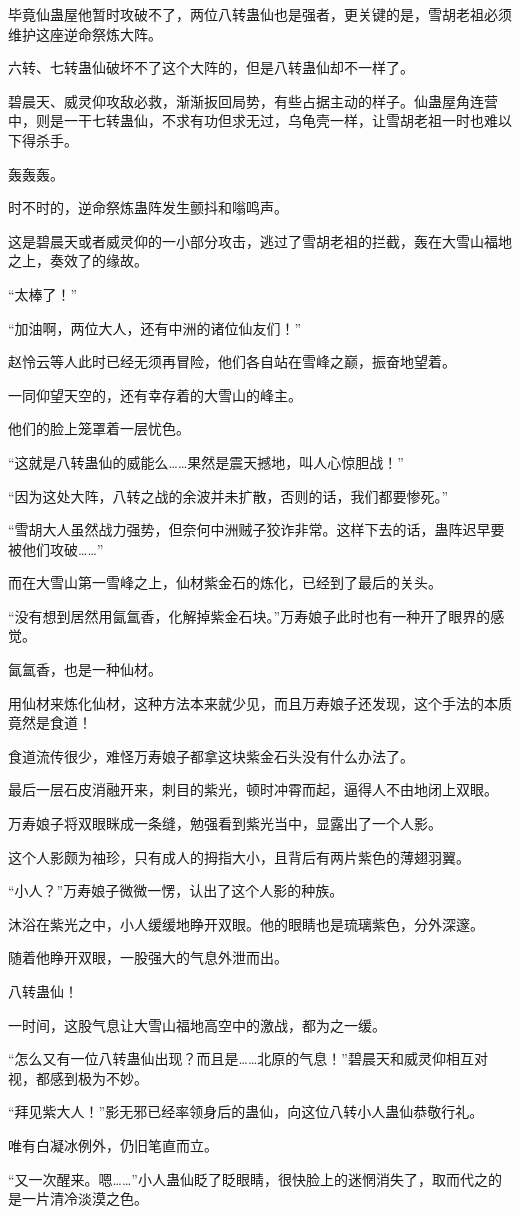 \begin{this_body}
毕竟仙蛊屋他暂时攻破不了，两位八转蛊仙也是强者，更关键的是，雪胡老祖必须维护这座逆命祭炼大阵。

六转、七转蛊仙破坏不了这个大阵的，但是八转蛊仙却不一样了。

碧晨天、威灵仰攻敌必救，渐渐扳回局势，有些占据主动的样子。仙蛊屋角连营中，则是一干七转蛊仙，不求有功但求无过，乌龟壳一样，让雪胡老祖一时也难以下得杀手。

轰轰轰。

时不时的，逆命祭炼蛊阵发生颤抖和嗡鸣声。

这是碧晨天或者威灵仰的一小部分攻击，逃过了雪胡老祖的拦截，轰在大雪山福地之上，奏效了的缘故。

“太棒了！”

“加油啊，两位大人，还有中洲的诸位仙友们！”

赵怜云等人此时已经无须再冒险，他们各自站在雪峰之巅，振奋地望着。

一同仰望天空的，还有幸存着的大雪山的峰主。

他们的脸上笼罩着一层忧色。

“这就是八转蛊仙的威能么……果然是震天撼地，叫人心惊胆战！”

“因为这处大阵，八转之战的余波并未扩散，否则的话，我们都要惨死。”

“雪胡大人虽然战力强势，但奈何中洲贼子狡诈非常。这样下去的话，蛊阵迟早要被他们攻破……”

而在大雪山第一雪峰之上，仙材紫金石的炼化，已经到了最后的关头。

“没有想到居然用氤氲香，化解掉紫金石块。”万寿娘子此时也有一种开了眼界的感觉。

氤氲香，也是一种仙材。

用仙材来炼化仙材，这种方法本来就少见，而且万寿娘子还发现，这个手法的本质竟然是食道！

食道流传很少，难怪万寿娘子都拿这块紫金石头没有什么办法了。

最后一层石皮消融开来，刺目的紫光，顿时冲霄而起，逼得人不由地闭上双眼。

万寿娘子将双眼眯成一条缝，勉强看到紫光当中，显露出了一个人影。

这个人影颇为袖珍，只有成人的拇指大小，且背后有两片紫色的薄翅羽翼。

“小人？”万寿娘子微微一愣，认出了这个人影的种族。

沐浴在紫光之中，小人缓缓地睁开双眼。他的眼睛也是琉璃紫色，分外深邃。

随着他睁开双眼，一股强大的气息外泄而出。

八转蛊仙！

一时间，这股气息让大雪山福地高空中的激战，都为之一缓。

“怎么又有一位八转蛊仙出现？而且是……北原的气息！”碧晨天和威灵仰相互对视，都感到极为不妙。

“拜见紫大人！”影无邪已经率领身后的蛊仙，向这位八转小人蛊仙恭敬行礼。

唯有白凝冰例外，仍旧笔直而立。

“又一次醒来。嗯……”小人蛊仙眨了眨眼睛，很快脸上的迷惘消失了，取而代之的是一片清冷淡漠之色。

\end{this_body}

